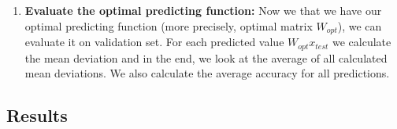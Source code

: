 \documentclass[a4paper,11pt,oneside]{article}
\begin{document}
\begin{enumerate}
\begin{center}
{  			{\bf Result:} A $k \times m$ dimensional weight matrix $W_{opt}$ which solves the following linear regression objective:
	  			\begin{equation}
	  				W_{opt} = \operatorname*{argmin}_{W \in \mathbb{R}^{k  \times m}} \sum_{i=1}^{N} || W x_i - y_i || ^ 2
	  			\end{equation} 
  			{\bf Step 1: } Sort the feature vectors row-wise into an $N \times m$ matrix $\Phi$ and the targets into an $N \times k$ matrix Z.
  			
  			{\bf Step 2:} Compute the result by $W_{opt}' = (\Phi' \Phi)^{-1}\Phi'Z$
  			
  			{\bf Step 2*:} We perform slight modification in this step to avoid numerical issues like inverting the singular matrix. These issues can be avoided by taking pseudo-inverse \cite{mllecturenotes}:
  			\begin{equation}
  				W_{opt}' = pseudoInverse(\Phi) Z
  			\end{equation}
  			In python we could implement it the following way:
  			\begin{equation}
  				Wopt = (np.linalg.pinv(Phi).dot(Z)).T
  			\end{equation} 
  			where matrices are 2D numpy \cite{numpy} arrays.
  			"This still gives optimal weights" \cite{mllecturenotes}.
  			}
 
    \end{center}
  	
  	\item {\bf Evaluate the optimal predicting function: } Now we that we have our optimal predicting function (more precisely, optimal matrix $W_{opt}$), we can evaluate it on validation set. For each predicted value $ W_{opt} x_{test}$ we calculate the mean deviation and in the end, we look at the average of all calculated mean deviations. We also calculate the average accuracy for all predictions.
  	  	
  \end{enumerate} 

  \subsection{Results}
  
\end{document}
